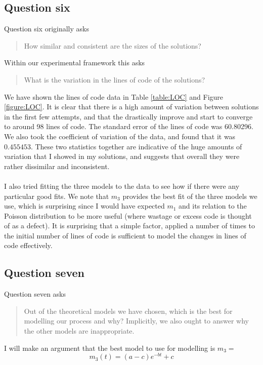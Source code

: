 \subsection{Question six}

Question six originally asks
\begin{quote}
  How similar and consistent are the sizes of the solutions?
\end{quote}

Within our experimental framework this asks
\begin{quote}
  What is the variation in the lines of code of the solutions?
\end{quote}

We have shown the lines of code data in Table \ref{table:LOC} and Figure \ref{figure:LOC}.
It is clear that there is a high amount of variation between solutions in the
first few attempts, and that the drastically improve and start to converge to
around 98 lines of code.
The standard error of the lines of code was 60.80296.
We also took the coefficient of variation of the data, and found that it was
$0.455453$.
These two statistics together are indicative of the huge amounts of variation
that I showed in my solutions, and suggests that overall they were rather
dissimilar and inconsistent.\\
\\
I also tried fitting the three models to the data to see how if there were any
particular good fits.
We note that $m_3$ provides the best fit of the three models we use, which is
surprising since I would have expected $m_1$ and its relation to the Poisson
distribution to be more useful (where wastage or excess code is thought of as a
defect).
It is surprising that a simple factor, applied a number of times to the initial
number of lines of code is sufficient to model the changes in lines of code
effectively.

\subsection{Question seven}

Question seven asks
\begin{quote}
  Out of the theoretical models we have chosen, which is the best for modelling
  our process and why?
  Implicitly, we also ought to answer why the other models are inappropriate.
\end{quote}

I will make an argument that the best model to use for modelling is $m_3 =$
\[
  m_3(t) = (a-c) e^{-bt} + c
\]

